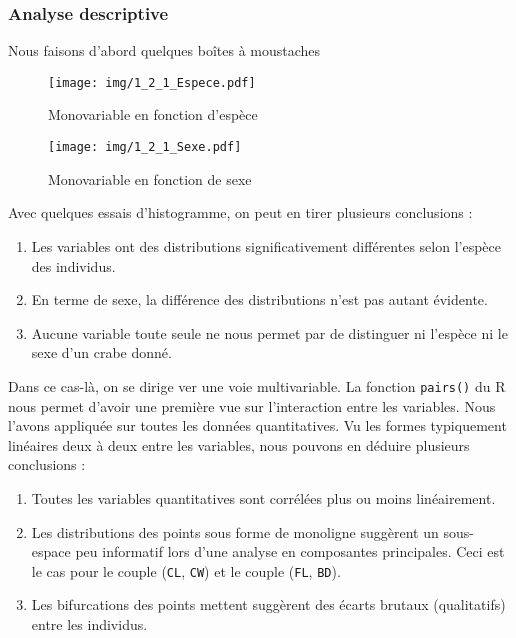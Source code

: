 \documentclass{article}
\begin{document}
\begin{multicols}{2}
	\subsubsection{Analyse descriptive}
	
	Nous faisons d'abord quelques boîtes à moustaches
	\begin{figure}[H]
		\centering
		\texttt{[image: img/1\_2\_1\_Espece.pdf]}
		\caption{Monovariable en fonction d'espèce}
		\label{fig:Monovariable en fonction d'espece}
	\end{figure}
	\begin{figure}[H]
		\centering
		\texttt{[image: img/1\_2\_1\_Sexe.pdf]}
		\caption{Monovariable en fonction de sexe}
		\label{fig:Monovariable en fonction de sexe}
	\end{figure}
	
	Avec quelques essais d'histogramme, on peut en tirer plusieurs conclusions :
	\begin{enumerate}
		\item Les variables ont des distributions significativement différentes selon l'espèce des individus.
		\item En terme de sexe, la différence des distributions n'est pas autant évidente.
		\item Aucune variable toute seule ne nous permet par de distinguer ni l'espèce ni le sexe d'un crabe donné. 
	\end{enumerate} 
	
	Dans ce cas-là, on se dirige ver une voie multivariable.
	La fonction \verb|pairs()| du R nous permet d'avoir une première vue sur l'interaction entre les variables. Nous l'avons appliquée sur toutes les données quantitatives. Vu les formes typiquement linéaires deux à deux entre les variables, nous pouvons en déduire plusieurs conclusions :
	\begin{enumerate}
        \item Toutes les variables quantitatives sont corrélées plus ou moins linéairement.
        \item Les distributions des points sous forme de monoligne suggèrent un sous-espace peu informatif lors d'une analyse en composantes principales. Ceci est le cas pour le couple (\verb|CL|, \verb|CW|) et le couple (\verb|FL|, \verb|BD|).
        \item Les bifurcations des points mettent suggèrent des écarts brutaux (qualitatifs) entre les individus.
    \end{enumerate}
	

\end{multicols}
\end{document}
